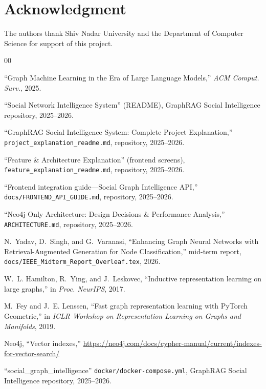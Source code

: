 \documentclass[conference]{IEEEtran}
\begin{document}
\section*{Acknowledgment}
The authors thank Shiv Nadar University and the Department of Computer Science for support of this project.


\begin{thebibliography}{00}

``Graph Machine Learning in the Era of Large Language Models,'' \emph{ACM Comput. Surv.}, 2025.

``Social Network Intelligence System'' (README), GraphRAG Social Intelligence repository, 2025--2026.

``GraphRAG Social Intelligence System: Complete Project Explanation,'' \texttt{project\_explanation\_readme.md}, repository, 2025--2026.

``Feature \& Architecture Explanation'' (frontend screens), \texttt{feature\_explanation\_readme.md}, repository, 2025--2026.

``Frontend integration guide—Social Graph Intelligence API,'' \texttt{docs/FRONTEND\_API\_GUIDE.md}, repository, 2025--2026.

``Neo4j-Only Architecture: Design Decisions \& Performance Analysis,'' \texttt{ARCHITECTURE.md}, repository, 2025--2026.

N.~Yadav, D.~Singh, and G.~Varanasi, ``Enhancing Graph Neural Networks with Retrieval-Augmented Generation for Node Classification,'' mid-term report, \texttt{docs/IEEE\_Midterm\_Report\_Overleaf.tex}, 2026.

W.~L. Hamilton, R.~Ying, and J.~Leskovec, ``Inductive representation learning on large graphs,'' in \emph{Proc. NeurIPS}, 2017.

M.~Fey and J.~E. Lenssen, ``Fast graph representation learning with PyTorch Geometric,'' in \emph{ICLR Workshop on Representation Learning on Graphs and Manifolds}, 2019.

Neo4j, ``Vector indexes,'' \url{https://neo4j.com/docs/cypher-manual/current/indexes-for-vector-search/}

``social\_graph\_intelligence'' \texttt{docker/docker-compose.yml}, GraphRAG Social Intelligence repository, 2025--2026.

\end{thebibliography}
\end{document}

